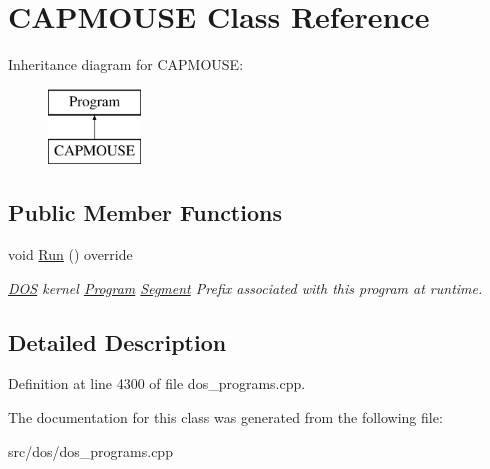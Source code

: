 \hypertarget{classCAPMOUSE}{\section{C\-A\-P\-M\-O\-U\-S\-E Class Reference}
\label{classCAPMOUSE}
}
Inheritance diagram for C\-A\-P\-M\-O\-U\-S\-E\-:\begin{figure}[H]
\begin{center}
\leavevmode
\includegraphics[height=2.000000cm]{classCAPMOUSE}
\end{center}
\end{figure}
\subsection*{Public Member Functions}
\begin{DoxyCompactItemize}
\item 
\hypertarget{classCAPMOUSE_a40f8a87bf9027081766fb5e0fc74149a}{void \hyperlink{classCAPMOUSE_a40f8a87bf9027081766fb5e0fc74149a}{Run} () override}\label{classCAPMOUSE_a40f8a87bf9027081766fb5e0fc74149a}

\begin{DoxyCompactList}\small\item\em \hyperlink{classDOS}{D\-O\-S} kernel \hyperlink{classProgram}{Program} \hyperlink{structSegment}{Segment} Prefix associated with this program at runtime. \end{DoxyCompactList}\end{DoxyCompactItemize}


\subsection{Detailed Description}


Definition at line 4300 of file dos\-\_\-programs.\-cpp.



The documentation for this class was generated from the following file\-:\begin{DoxyCompactItemize}
\item 
src/dos/dos\-\_\-programs.\-cpp\end{DoxyCompactItemize}
